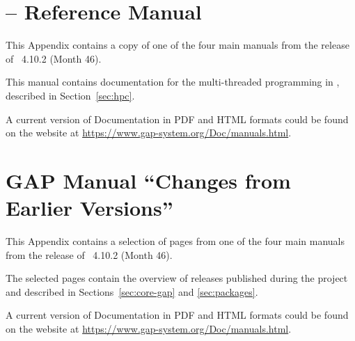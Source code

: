\documentclass{deliverablereport}
\author{Author names}
\begin{document}
\maketitle
\githubissuedescription

\newpage
\tableofcontents















\clearpage
\appendix

\section{\HPCGAP -- Reference Manual}\label{sec:hpc-manual}

This Appendix contains a copy of 
one of the four main \GAP manuals
from the release of \GAP~4.10.2 (Month 46).

This manual contains documentation for the multi-threaded programming
in \GAP, described in Section~\ref{sec:hpc}.

A current version of \GAP Documentation in PDF and HTML formats
could be found on the \GAP website at \url{https://www.gap-system.org/Doc/manuals.html}.

%

\section{GAP Manual ``Changes from Earlier Versions''}\label{sec:changes-manual}

This Appendix contains a selection of pages from
one of the four main \GAP manuals
from the release of \GAP~4.10.2 (Month 46).

The selected pages contain the overview of \GAP releases published
during the project and described in Sections~\ref{sec:core-gap} and \ref{sec:packages}.

A current version of \GAP Documentation in PDF and HTML formats
could be found on the \GAP website at \url{https://www.gap-system.org/Doc/manuals.html}.

%



\clearpage
\printbibliography
\end{document}
